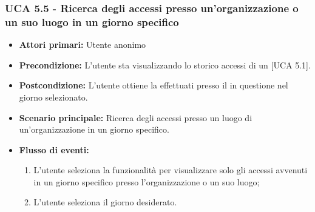 \subsubsection{UCA 5.5 - Ricerca degli accessi presso un'organizzazione o un suo luogo in un giorno specifico}
\begin{itemize}
    \item \textbf{Attori primari:} Utente anonimo
    \item \textbf{Precondizione:} L'utente sta visualizzando lo storico accessi di un  [UCA 5.1].
    \item \textbf{Postcondizione:} L'utente ottiene la  effettuati presso il  in questione nel giorno selezionato.
    \item \textbf{Scenario principale:} Ricerca degli accessi presso un luogo di un'organizzazione in un giorno specifico.
    \item \textbf{Flusso di eventi:}
    \begin{enumerate}
        \item L'utente seleziona la funzionalità per visualizzare solo gli accessi avvenuti in un giorno specifico presso l'organizzazione o un suo luogo;
        \item L'utente seleziona il giorno desiderato.
    \end{enumerate}
\end{itemize}